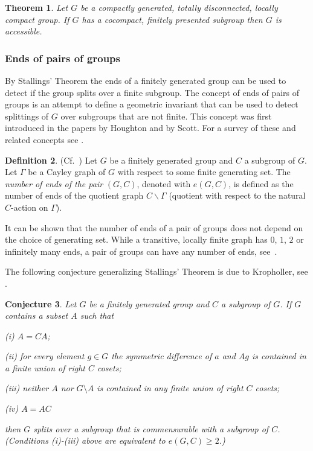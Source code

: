 \documentclass{emsprocart}
\newtheorem{theorem}{Theorem}[section]
\newtheorem{conjecture}[theorem]{Conjecture}
\theoremstyle{definition}
\newtheorem{definition}[theorem]{Definition}
\begin{document}
\begin{theorem}
Let $G$ be a compactly generated, totally disconnected, locally compact
group.  If $G$ has a cocompact, finitely presented subgroup then $G$ is
accessible.
\end{theorem}

\subsubsection{Ends of pairs of groups}
By Stallings' Theorem the ends of a finitely generated group can be
used to detect if the
group splits over a finite subgroup.  The concept of ends of pairs of
groups is an attempt to define a geometric invariant that can be used
to detect splittings of $G$ over subgroups that are not 
finite.  This concept was first introduced in the papers \cite{Houghton1974}
by Houghton and \cite{Scott1977} by Scott.
For a survey of these
and related concepts see \cite{Wall2003}.

\begin{definition}{\rm (Cf.~\cite[Lemma~1.1]{Scott1977})}  Let $G$ be a finitely
  generated group and $C$ a subgroup of $G$.  Let $\Gamma$ be a
  Cayley graph of $G$ with respect to some finite generating set.  The
  {\em number of ends of the pair} $(G,C)$, denoted with $e(G,C)$,  
is defined as the number of ends
  of the quotient graph $C\backslash\Gamma$  (quotient with respect to the
  natural $C$-action on $\Gamma$).  
\end{definition}

It can be shown that the number of ends of a pair of groups does not
depend on the choice of generating set. While a transitive, locally finite
graph has $0$, $1$, $2$ or infinitely many ends, a pair of groups can
have any number of ends, see~\cite[Example~2.1]{Scott1977}.

The following conjecture generalizing Stallings' Theorem
is due to Kropholler, see \cite{NibloSageev2006}.

\begin{conjecture}
Let $G$ be a finitely generated group and $C$ a subgroup of $G$.  If 
$G$ contains a subset $A$ such that 

(i) $A=CA$;

(ii) for every element $g\in G$ the symmetric difference of $a$ and
$Ag$ is contained 
in a finite union of right $C$ cosets;

(iii)  neither $A$ nor $G\setminus A$ is contained in any finite union
of  right $C$ cosets;

(iv) $A=AC$

\noindent
then $G$ splits over a subgroup that is commensurable
with a subgroup of $C$.  (Conditions (i)-(iii) above are equivalent to
$e(G,C)\geq 2$.)
\end{conjecture}
\end{document}
